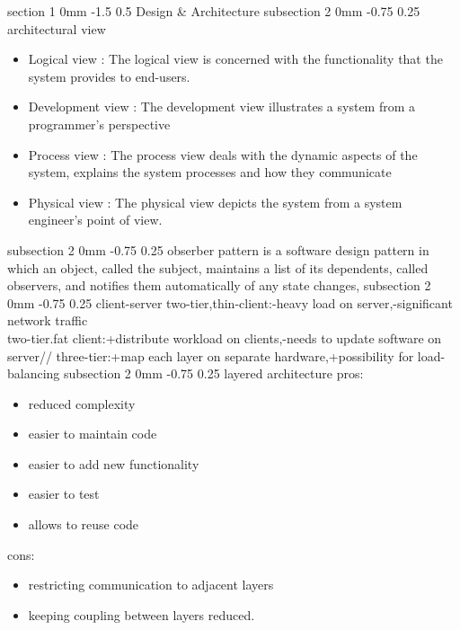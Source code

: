 \documentclass[a4paper,11pt]{article}
\makeatletter
\renewcommand{\section}{\@startsection
   {section}%
   {1}%
   {0mm}%
   {-1.5\baselineskip}%
   {0.5\baselineskip}%
   {\sffamily\bfseries\upshape\normalsize}}%
\renewcommand{\subsection}{\@startsection
   {subsection}%
   {2}%
   {0mm}%
   {-0.75\baselineskip}%
   {0.25\baselineskip}%
   {\rmfamily\normalfont\slshape\normalsize}}%
\makeatother
\begin{document}
\section{Design \& Architecture}
\subsection{architectural view}
\begin{itemize}
\item Logical view : The logical view is concerned with the functionality that the system provides to end-users. 
\item Development view : The development view illustrates a system from a programmer's perspective
\item Process view : The process view deals with the dynamic aspects of the system, explains the system processes and how they communicate
\item Physical view : The physical view depicts the system from a system engineer's point of view.
\end{itemize}
\subsection{obserber pattern}
 is a software design pattern in which an object, called the subject, maintains a list of its dependents, called observers, and notifies them automatically of any state changes, 
 \subsection{client-server}
 two-tier,thin-client:-heavy load on server,-significant network traffic\\
 two-tier.fat client:+distribute workload on clients,-needs to update software on server//
 three-tier:+map each layer on separate hardware,+possibility for load-balancing
\subsection{layered architecture}
pros:
\begin{itemize}
\item reduced complexity
\item easier to maintain code
\item easier to add new functionality
\item easier to test
\item allows to reuse code
\end{itemize}
cons:
\begin{itemize}
\item restricting communication to adjacent layers
\item keeping coupling between layers reduced.
\end{itemize}
\end{document}
